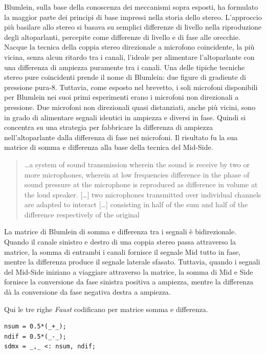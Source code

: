Blumlein, sulla base della conoscenza dei meccanismi sopra esposti, ha formulato
la maggior parte dei principi di base impressi nella storia dello stereo.
L'approccio più basilare allo stereo si basava su semplici differenze di livello
nella riproduzione degli altoparlanti, percepite come differenze di livello e di
fase alle orecchie. Nacque la tecnica della coppia stereo direzionale a
microfono coincidente, la più vicina, senza alcun ritardo tra i canali,
l'ideale per alimentare l'altoparlante con una differenza di ampiezza puramente
tra i canali. Una delle tipiche tecniche stereo pure coincidenti prende il nome
di Blumlein: due figure di gradiente di pressione pura-8. Tuttavia, come esposto
nel brevetto, i soli microfoni disponibili per Blumlein nei suoi primi
esperimenti erano i microfoni non direzionali a pressione. Due microfoni non
direzionali quasi distanziati, anche più vicini, sono in grado di alimentare
segnali identici in ampiezza e diversi in fase. Quindi si concentra su una
strategia per fabbricare la differenza di ampiezza nell'altoparlante dalla
differenza di fase nei microfoni. Il risultato fu la sua matrice di somma e
differenza alla base della tecnica del Mid-Side.

\begin{quotation}
\ldots a system of sound transmission wherein the sound
is receive by two or more microphones, wherein at low frequencies difference in
the phase of sound pressure at the microphone is reproduced as difference in
volume at the loud speaker. [\ldots] two microphones transmitted over individual
channels are adapted to interact [\ldots] consisting in half of the sum and half
of the difference respectively of the original \cite{ab58}
\end{quotation}

La matrice di Blumlein di somma e differenza tra i segnali è bidirezionale.
Quando il canale sinistro e destro di una coppia stereo passa attraverso la
matrice, la somma di entrambi i canali fornisce il segnale Mid tutto in fase,
mentre la differenza produce il segnale laterale sfasato. Tuttavia, quando i
segnali del Mid-Side iniziano a viaggiare attraverso la matrice, la somma di Mid
e Side fornisce la conversione da fase sinistra positiva a ampiezza, mentre la
differenza dà la conversione da fase negativa destra a ampiezza.

Qui le tre righe \emph{Faust} codificano per matrice somma e differenza.%

\begin{lstlisting}
nsum = 0.5*(_+_);
ndif = 0.5*(_-_);
sdmx = _,_ <: nsum, ndif;
\end{lstlisting}



